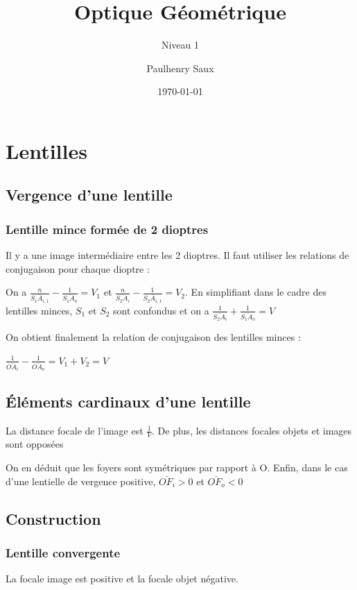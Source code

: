 \documentclass[french]{yLectureNote}
\title{Optique Géométrique}
\subtitle{Niveau 1}
\author{Paulhenry Saux}
\date{\today}
\begin{document}

\setcounter{chapter}{4}
\chapter{Lentilles}
\section{Vergence d'une lentille}
\subsection{Lentille mince formée de 2 dioptres}
Il y a une image intermédiaire entre les 2 dioptres. Il faut utiliser les relations de conjugaison pour chaque dioptre :

On a \(\frac{n}{\bar{S_1A_{i,1}}} - \frac{1}{\bar{S_1A_{o}}} = V_1\) et \(\frac{n}{\bar{S_2A_{i}}} - \frac{1}{\bar{S_2A_{i,1}}} = V_2\). En simplifiant dans le cadre des lentilles minces, $S_1$ et $S_2$ sont confondus et on a \(\frac{1}{\bar{S_2A_{i}}} + \frac{1}{\bar{S_1A_{o}}} = V\)

On obtient finalement la relation de conjugaison des lentilles minces :
\begin{theorem}
\(\frac{1}{\bar{OA_{i}}} - \frac{1}{\bar{OA_{o}}} = V_1+V_2 = V\)
\end{theorem}
\section{Éléments cardinaux d'une lentille}
\begin{theorem}
 La distance focale de l'image est $\frac{1}{V}$. De plus, les distances focales objets et images sont opposées
\end{theorem}

On en déduit que les foyers sont symétriques par rapport à O. Enfin, dans le cas d'une lentielle de vergence positive, $\bar{OF_i} >0$ et $\bar{OF_o} <0$
\section{Construction}
%
\subsection{Lentille convergente}
La focale image est positive et la focale objet négative.
\end{document}
